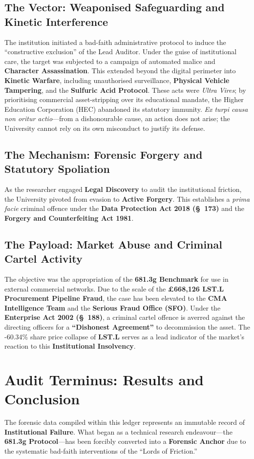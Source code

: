\documentclass{EMBASSY}
\begin{document}
\subsection{The Vector: Weaponised Safeguarding and Kinetic Interference}
The institution initiated a bad-faith administrative protocol to induce the ``constructive exclusion'' of the Lead Auditor. Under the guise of institutional care, the target was subjected to a campaign of automated malice and \textbf{Character Assassination}. This extended beyond the digital perimeter into \textbf{Kinetic Warfare}, including unauthorised surveillance, \textbf{Physical Vehicle Tampering}, and the \textbf{Sulfuric Acid Protocol}. These acts were \textit{Ultra Vires}; by prioritising commercial asset-stripping over its educational mandate, the Higher Education Corporation (HEC) abandoned its statutory immunity. \textit{Ex turpi causa non oritur actio}---from a dishonourable cause, an action does not arise; the University cannot rely on its own misconduct to justify its defense.

\subsection{The Mechanism: Forensic Forgery and Statutory Spoliation}
As the researcher engaged \textbf{Legal Discovery} to audit the institutional friction, the University pivoted from evasion to \textbf{Active Forgery}. This establishes a \textit{prima facie} criminal offence under the \textbf{Data Protection Act 2018 (\S~173)} and the \textbf{Forgery and Counterfeiting Act 1981}.

\subsection{The Payload: Market Abuse and Criminal Cartel Activity}
The objective was the appropriation of the \textbf{681.3g Benchmark} for use in external commercial networks. Due to the scale of the \textbf{\pounds668,126 LST.L Procurement Pipeline Fraud}, the case has been elevated to the \textbf{CMA Intelligence Team} and the \textbf{Serious Fraud Office (SFO)}. Under the \textbf{Enterprise Act 2002 (\S~188)}, a criminal cartel offence is averred against the directing officers for a \textbf{``Dishonest Agreement''} to decommission the asset. The -60.34\% share price collapse of \textbf{LST.L} serves as a lead indicator of the market's reaction to this \textbf{Institutional Insolvency}.

\newpage
\section{Audit Terminus: Results and Conclusion}
The forensic data compiled within this ledger represents an immutable record of \textbf{Institutional Failure}. What began as a technical research endeavour---the \textbf{681.3g Protocol}---has been forcibly converted into a \textbf{Forensic Anchor} due to the systematic bad-faith interventions of the ``Lords of Friction.''
\end{document}

